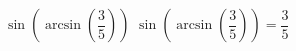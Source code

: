  {$\sin\left(\arcsin\left(\dfrac{3}{5}\right)\right)$ }
{ $\sin\left(\arcsin\left(\dfrac{3}{5}\right)\right) = \dfrac{3}{5}$}
